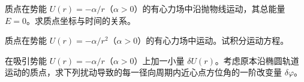 \newpage
\noindent\begin{minipage}{\textwidth}
质点在势能 $U(r)=-\alpha/r$（$\alpha>0$）的有心力场中沿抛物线运动，其总能量 $E=0$。求质点坐标与时间的关系。
\end{minipage}\par\vfill
\noindent\begin{minipage}{\textwidth}
质点在势能 $U(r)=-\alpha/r^2$（$\alpha>0$）的有心力场中运动。试积分运动方程。
\end{minipage}\par\vfill
\newpage
\noindent\begin{minipage}{\textwidth}
在吸引势能 $U(r)=-\alpha/r$（$\alpha>0$）上加一小量 $\delta U(r)$。考虑原本沿椭圆轨道运动的质点，求下列扰动导致的每一径向周期内近心点方位角的一阶改变量 $\delta\varphi$。
\end{minipage}\par\vfill
